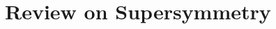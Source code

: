 \documentclass[a4paper,pdftex,10pt]{report}
\begin{document}
\maketitle

\tableofcontents

\clearpage
\chapter{Review on Supersymmetry}



















\clearpage
\appendix
















\clearpage



\nocite{Nelson:1993nf}
\nocite{Martin:1997ns}

\end{document}
